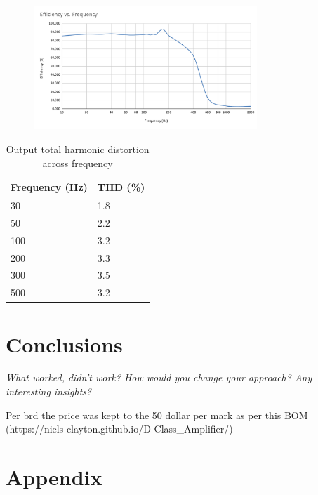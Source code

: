 \documentclass[11pt]{article}
\begin{document}
{\begin{figure}[h!]
  \centering
  \includegraphics[width=0.75\textwidth]{img/testing/Efficiency_vs._Frequency.pdf}
  \caption{}
\end{figure}

\begin{table}[h!]
  \centering
  \begin{tabular}{l|l}
  \rowcolor[HTML]{E0E0E0} 
  \textbf{Frequency (Hz)} & \textbf{THD (\%)} \\ \hline
  30                 & 1.8               \\
  50                 & 2.2               \\
  100                & 3.2               \\
  200                & 3.3               \\
  300                & 3.5               \\
  500                & 3.2              
  \end{tabular}
  \caption{Output total harmonic distortion across frequency}
  \label{T:THD}
\end{table}


\section{Conclusions}
 
\textit{What worked, didn’t work? How would you change your approach? Any interesting insights?}

Per brd the price was kept to the 50 dollar per mark as per this BOM (https://niels-clayton.github.io/D-Class\_Amplifier/)

\newpage
\section*{Appendix}

}
\end{document}
